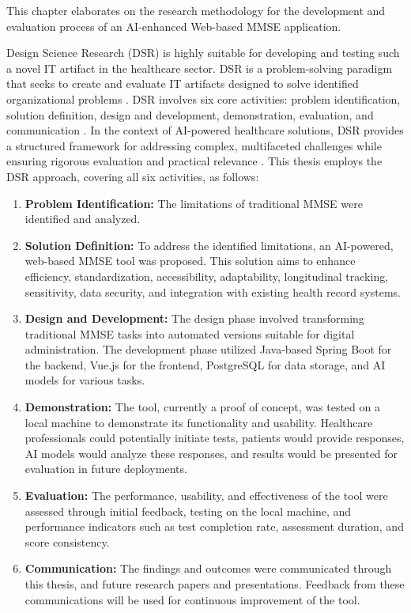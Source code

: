 This chapter elaborates on the research methodology for the development and evaluation process of an AI-enhanced Web-based MMSE application.

Design Science Research (DSR) is highly suitable for developing and testing such a novel IT artifact in the healthcare sector. DSR is a problem-solving paradigm that seeks to create and evaluate IT artifacts designed to solve identified organizational problems \cite{Hevner2004,Peffers2007}. DSR involves six core activities: problem identification, solution definition, design and development, demonstration, evaluation, and communication \cite{Peffers2007}. In the context of AI-powered healthcare solutions, DSR provides a structured framework for addressing complex, multifaceted challenges while ensuring rigorous evaluation and practical relevance \cite{Gregor2013}. This thesis employs the DSR approach, covering all six activities, as follows:

\begin{enumerate}
    \item \textbf{Problem Identification:} The limitations of traditional MMSE were identified and analyzed.

    \item \textbf{Solution Definition:} To address the identified limitations, an AI-powered, web-based MMSE tool was proposed. This solution aims to enhance efficiency, standardization, accessibility, adaptability, longitudinal tracking, sensitivity, data security, and integration with existing health record systems.

    \item \textbf{Design and Development:} The design phase involved transforming traditional MMSE tasks into automated versions suitable for digital administration. The development phase utilized Java-based Spring Boot for the backend, Vue.js for the frontend, PostgreSQL for data storage, and AI models for various tasks.

    \item \textbf{Demonstration:} The tool, currently a proof of concept, was tested on a local machine to demonstrate its functionality and usability. Healthcare professionals could potentially initiate tests, patients would provide responses, AI models would analyze these responses, and results would be presented for evaluation in future deployments.

    \item \textbf{Evaluation:} The performance, usability, and effectiveness of the tool were assessed through initial feedback, testing on the local machine, and performance indicators such as test completion rate, assessment duration, and score consistency.

    \item \textbf{Communication:} The findings and outcomes were communicated through this thesis, and future research papers and presentations. Feedback from these communications will be used for continuous improvement of the tool.
\end{enumerate}

